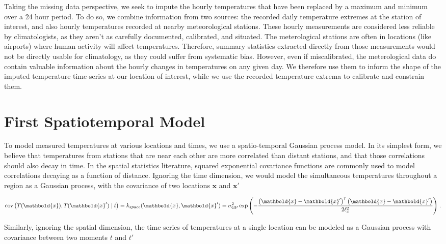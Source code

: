 \documentclass[letter]{article}
\newcommand{\genericdel}[3]{%
      \left#1#3\right#2
    }
\newcommand{\del}[1]{\genericdel(){#1}}
\DeclareMathOperator{\cov}{{cov}}
\newcommand{\xvec}{\mathbold{x}}
\newcommand{\trans}{^{\intercal}}
\newcommand{\sigmaf}{\sigma_{\mathrm{GP}}}
\begin{document}
Taking the missing data perspective, we seek to impute the hourly temperatures that have been replaced by a maximum and minimum over a 24 hour period.
To do so, we combine information from two sources: the recorded daily temperature extremes at the station of interest, and also hourly temperatures recorded at nearby meteorological stations.
These hourly measurements are considered less reliable by climatologists, as they aren't as carefully documented, calibrated, and situated.
The meterological stations are often in locations (like airports) where human activity will affect temperatures.
Therefore, summary statistics extracted directly from those measurements would not be directly usable for climatology, as they could suffer from systematic bias.
However, even if miscalibrated, the meterological data do contain valuable information about the hourly changes in temperatures on any given day.
We therefore use them to inform the shape of the imputed temperature time-series at our location of interest,
while we use the recorded temperature extrema to calibrate and constrain them.
    


        \section{First Spatiotemporal Model}\label{first-spatiotemporal-model}

To model measured temperatures at various locations and times, we use a spatio-temporal Gaussian process model.
In its simplest form, we believe that temperatures from stations that are near each other are more correlated than distant stations, and that those correlations should also decay in time.
In the spatial statistics literature, squared exponential covariance functions are commonly used to model correlations decaying as a function of distance.
Ignoring the time dimension, we would model the simultaneous temperatures throughout a region as a Gaussian process, with the covariance of two locations \(\xvec\) and \(\xvec'\)

\begin{equation}
    \label{eq:kspace}
    \cov\del{T(\xvec), T(\xvec') \mid t} = k_{space}(\xvec, \xvec') = \sigmaf^2 \exp\del{-\frac{\del{\xvec-\xvec'}\trans\del{\xvec-\xvec'}}{2\ell_x^2}}\,.
\end{equation}

Similarly, ignoring the spatial dimension, the time series of temperatures at a single location can be modeled as a Gaussian process with covariance between two moments \(t\) and \(t'\)
\end{document}
